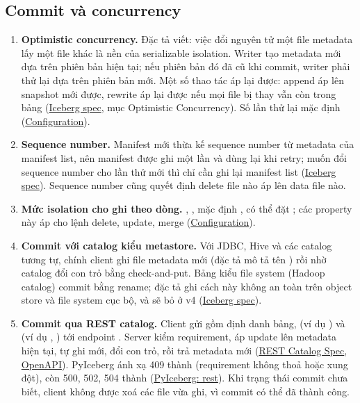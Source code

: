 \subsection{Commit và concurrency}
\begin{enumerate}[resume]
  \item \textbf{Optimistic concurrency.} Đặc tả viết: việc đổi nguyên tử một file metadata lấy một file khác là nền của serializable isolation. Writer tạo metadata mới dựa trên phiên bản hiện tại; nếu phiên bản đó đã cũ khi commit, writer phải thử lại dựa trên phiên bản mới. Một số thao tác áp lại được: append áp lên snapshot mới được, rewrite áp lại được nếu mọi file bị thay vẫn còn trong bảng (\href{https://iceberg.apache.org/spec/}{Iceberg spec}, mục Optimistic Concurrency). Số lần thử lại mặc định  (\href{https://iceberg.apache.org/docs/latest/configuration/}{Configuration}).
  \item \textbf{Sequence number.} Manifest mới thừa kế sequence number từ metadata của manifest list, nên manifest được ghi một lần và dùng lại khi retry; muốn đổi sequence number cho lần thử mới thì chỉ cần ghi lại manifest list (\href{https://iceberg.apache.org/spec/}{Iceberg spec}). Sequence number cũng quyết định delete file nào áp lên data file nào.
  \item \textbf{Mức isolation cho ghi theo dòng.} , ,  mặc định , có thể đặt ; các property này áp cho lệnh delete, update, merge (\href{https://iceberg.apache.org/docs/latest/configuration/}{Configuration}).
  \item \textbf{Commit với catalog kiểu metastore.} Với JDBC, Hive và các catalog tương tự, chính client ghi file metadata mới (đặc tả mô tả tên ) rồi nhờ catalog đổi con trỏ bằng check-and-put. Bảng kiểu file system (Hadoop catalog) commit bằng rename; đặc tả ghi cách này không an toàn trên object store và file system cục bộ, và sẽ bỏ ở v4 (\href{https://iceberg.apache.org/spec/}{Iceberg spec}).
  \item \textbf{Commit qua REST catalog.} Client gửi  gồm định danh bảng,  (ví dụ ) và  (ví dụ , ) tới endpoint . Server kiểm requirement, áp update lên metadata hiện tại, tự ghi  mới, đổi con trỏ, rồi trả metadata mới (\href{https://iceberg.apache.org/rest-catalog-spec/}{REST Catalog Spec}, \href{https://github.com/apache/iceberg/blob/main/open-api/rest-catalog-open-api.yaml}{OpenAPI}). PyIceberg ánh xạ 409 thành  (requirement không thoả hoặc xung đột), còn 500, 502, 504 thành  (\href{https://py.iceberg.apache.org/reference/pyiceberg/catalog/rest/}{PyIceberg: rest}). Khi trạng thái commit chưa biết, client không được xoá các file vừa ghi, vì commit có thể đã thành công.
\end{enumerate}

